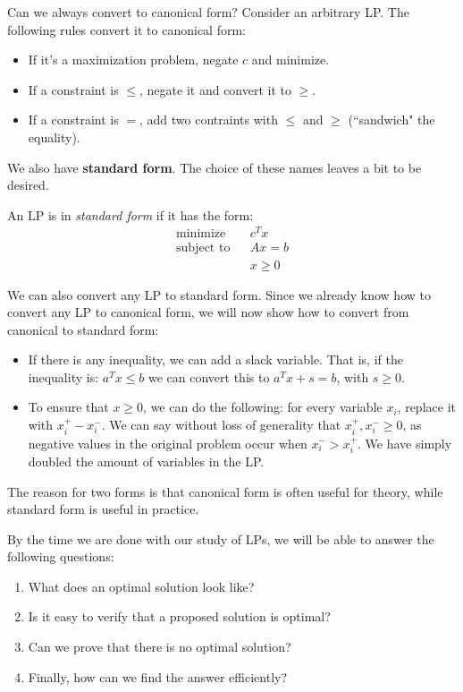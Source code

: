 \documentclass{article}
\begin{document}
Can we always convert to canonical form?  Consider an arbitrary LP.  
The following rules convert it to canonical form:

\begin{itemize}
\item If it's a maximization problem, negate $c$ and minimize.
\item If a constraint is $\leq$, negate it and convert it to $\geq$.
\item If a constraint is $=$, add two contraints with $\leq$ and
  $\geq$ (``sandwich" the equality).
\end{itemize}

We also have \textbf{standard form}.  The choice of these names leaves
a bit to be desired.

\begin{definition}
  An LP is in \emph{standard form} if it has the form:
  \begin{eqnarray*}
    \textrm{minimize } & & c^T x\\
    \textrm{subject to} & & Ax = b\\
    && x \geq 0
  \end{eqnarray*}
\end{definition}

We can also convert any LP to standard form.  Since we already know how to
convert any LP to canonical form, we will now show how to convert from canonical
to standard form:

\begin{itemize}
 \item   If there is any inequality, we can add a slack variable.
	That is, if the inequality is: $a^T x \leq b$ we can 
	convert this to $a^T x + s = b$, with $s\geq 0$.
\item To ensure that $x \geq 0$, we can do the following: for every variable $x_i$,
	replace it with $x_i^+ - x_i^-$.  We can say without loss of generality that
	$x_i^+, x_i^- \geq 0$, as negative values in the original problem occur when $x_i^- > x_i^+$.  We have simply doubled the amount of variables in the LP.
\end{itemize}

The reason for two forms is that canonical form is
often useful for theory, while standard form is useful in practice.

By the time we are done with our study of LPs, we will be able to answer the following questions: 

\begin{enumerate}

\item What does an optimal solution look like?

\item Is it easy to verify that a proposed solution is optimal?

\item Can we prove that there is no optimal solution?

\item Finally, how can we find the answer efficiently?

\end{enumerate}
\end{document}
